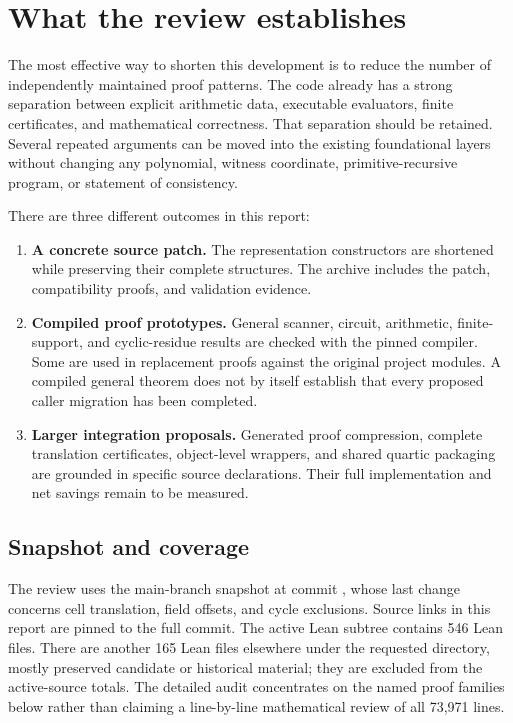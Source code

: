 \documentclass[11pt,letterpaper]{article}
\newcommand{\code}[1]{\texttt{\detokenize{#1}}}
\begin{document}
{\setlength{\parskip}{0pt}\small\tableofcontents}
\newpage

\section{What the review establishes}

The most effective way to shorten this development is to reduce the number of independently maintained proof patterns. The code already has a strong separation between explicit arithmetic data, executable evaluators, finite certificates, and mathematical correctness. That separation should be retained. Several repeated arguments can be moved into the existing foundational layers without changing any polynomial, witness coordinate, primitive-recursive program, or statement of consistency.

There are three different outcomes in this report:
\begin{enumerate}
\item \textbf{A concrete source patch.} The representation constructors are shortened while preserving their complete \code{Rep} structures. The archive includes the patch, compatibility proofs, and validation evidence.
\item \textbf{Compiled proof prototypes.} General scanner, circuit, arithmetic, finite-support, and cyclic-residue results are checked with the pinned compiler. Some are used in replacement proofs against the original project modules. A compiled general theorem does not by itself establish that every proposed caller migration has been completed.
\item \textbf{Larger integration proposals.} Generated proof compression, complete translation certificates, object-level wrappers, and shared quartic packaging are grounded in specific source declarations. Their full implementation and net savings remain to be measured.
\end{enumerate}

\subsection{Snapshot and coverage}

The review uses the main-branch snapshot at commit \code{60e9c5d620c6}, whose last change concerns cell translation, field offsets, and cycle exclusions. Source links in this report are pinned to the full commit. The active Lean subtree contains 546 Lean files. There are another 165 Lean files elsewhere under the requested directory, mostly preserved candidate or historical material; they are excluded from the active-source totals. The detailed audit concentrates on the named proof families below rather than claiming a line-by-line mathematical review of all 73,971 lines.
\end{document}
